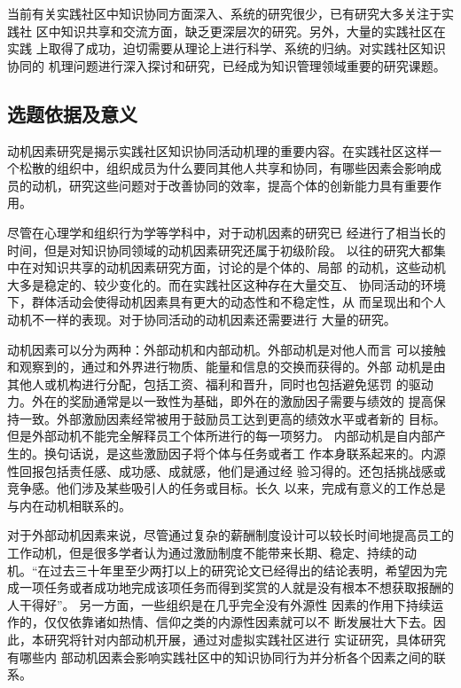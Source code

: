 当前有关实践社区中知识协同方面深入、系统的研究很少，已有研究大多关注于实践社
区中知识共享和交流方面，缺乏更深层次的研究。另外，大量的实践社区在实践
上取得了成功，迫切需要从理论上进行科学、系统的归纳。对实践社区知识协同的
机理问题进行深入探讨和研究，已经成为知识管理领域重要的研究课题。

\subsection{选题依据及意义}

动机因素研究是揭示实践社区知识协同活动机理的重要内容。在实践社区这样一
个松散的组织中，组织成员为什么要同其他人共享和协同，有哪些因素会影响成
员的动机，研究这些问题对于改善协同的效率，提高个体的创新能力具有重要作用。

尽管在心理学和组织行为学等学科中，对于动机因素的研究已
经进行了相当长的时间，但是对知识协同领域的动机因素研究还属于初级阶段。
以往的研究大都集中在对知识共享的动机因素研究方面，讨论的是个体的、局部
的动机，这些动机大多是稳定的、较少变化的。而在实践社区这种存在大量交互、
协同活动的环境下，群体活动会使得动机因素具有更大的动态性和不稳定性，从
而呈现出和个人动机不一样的表现。对于协同活动的动机因素还需要进行
大量的研究。



动机因素可以分为两种：外部动机和内部动机。外部动机是对他人而言
可以接触和观察到的，通过和外界进行物质、能量和信息的交换而获得的。外部
动机是由其他人或机构进行分配，包括工资、福利和晋升，同时也包括避免惩罚
的驱动力。外在的奖励通常是以一致性为基础，即外在的激励因子需要与绩效的
提高保持一致。外部激励因素经常被用于鼓励员工达到更高的绩效水平或者新的
目标。但是外部动机不能完全解释员工个体所进行的每一项努力。
 内部动机是自内部产生的。换句话说，是这些激励因子将个体与任务或者工
 作本身联系起来的。内源性回报包括责任感、成功感、成就感，他们是通过经
 验习得的。还包括挑战感或竞争感。他们涉及某些吸引人的任务或目标。长久
 以来，完成有意义的工作总是与内在动机相联系的\cite{Luthans2001}。

对于外部动机因素来说，尽管通过复杂的薪酬制度设计可以较长时间地提高员工的
工作动机，但是很多学者认为通过激励制度不能带来长期、稳定、持续的动机。“在过去三十年里至少两打以上的研究论文已经得出的结论表明，希望因为完成一项任务或者成功地完成该项任务而得到奖赏的人就是没有根本不想获取报酬的人干得好”\cite{93120316461993}。
另一方面，一些组织是在几乎完全没有外源性
因素的作用下持续运作的，仅仅依靠诸如热情、信仰之类的内源性因素就可以不
断发展壮大下去。因此，本研究将针对内部动机开展，通过对虚拟实践社区进行
实证研究，具体研究有哪些内
部动机因素会影响实践社区中的知识协同行为并分析各个因素之间的联系。


